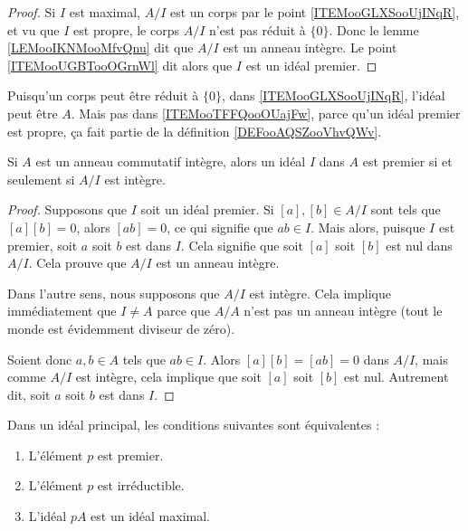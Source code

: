 \begin{proof}
	Si \( I\) est maximal, \( A/I\) est un corps par le point \ref{ITEMooGLXSooUjINqR}, et vu que \( I\) est propre, le corps \( A/I\) n'est pas réduit à \( \{ 0 \}\). Donc le lemme \ref{LEMooIKNMooMfvQnu} dit que \( A/I\) est un anneau intègre. Le point \ref{ITEMooUGBTooOGrnWl} dit alors que \( I\) est un idéal premier.
\end{proof}

\begin{remark}
	Puisqu'un corps peut être réduit à \( \{0\}\), dans \ref{ITEMooGLXSooUjINqR}, l'idéal peut être \( A\). Mais pas dans \ref{ITEMooTFFQooOUajFw}, parce qu'un idéal premier est propre, ça fait partie de la définition \ref{DEFooAQSZooVhvQWv}.
\end{remark}

\begin{proposition}     \label{PROPooHABIooBZZQMj}
	Si \( A\) est un anneau commutatif intègre, alors un idéal \( I\) dans \( A\) est premier si et seulement si \( A/I\) est intègre.
\end{proposition}

\begin{proof}
	Supposons que \( I\) soit un idéal premier. Si \( [a],[b] \in A/I\)  sont tels que \( [a][b]=0\), alors \( [ab]=0\), ce qui signifie que \( ab\in I\). Mais alors, puisque \( I\) est premier, soit \( a\) soit \( b\) est dans \( I\). Cela signifie que soit \( [a]\) soit \( [b]\) est nul dans \( A/I\). Cela prouve que \( A/I\) est un anneau intègre.

	Dans l'autre sens, nous supposons que \( A/I\) est intègre. Cela implique immédiatement que \( I\neq A\) parce que \( A/A\) n'est pas un anneau intègre (tout le monde est évidemment diviseur de zéro).

	Soient donc \( a,b\in A\) tels que \( ab\in I\). Alors \( [a][b]=[ab]=0\) dans \( A/I\), mais comme \( A/I\) est intègre, cela implique que soit \( [a]\) soit \( [b]\) est nul. Autrement dit, soit \( a\) soit \( b\) est dans \( I\).
\end{proof}

\begin{proposition}		\label{PROPooSGLNooBYKNyo}
	Dans un idéal principal, les conditions suivantes sont équivalentes :
	\begin{enumerate}
		\item
		      L'élément	\( p\) est premier.
		\item
		      L'élément \( p\) est irréductible.
		\item
		      L'idéal \( pA\) est un idéal maximal.
	\end{enumerate}
\end{proposition}


